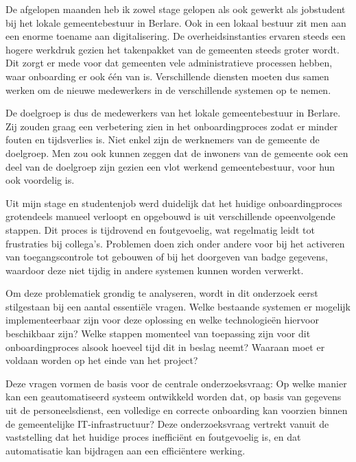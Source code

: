 
De afgelopen maanden heb ik zowel stage gelopen als ook gewerkt als jobstudent bij het lokale gemeentebestuur in Berlare. Ook in een lokaal bestuur zit men aan een enorme toename aan digitalisering. De overheidsinstanties ervaren steeds een hogere werkdruk gezien het takenpakket van de gemeenten steeds groter wordt. Dit zorgt er mede voor dat gemeenten vele administratieve processen hebben, waar onboarding er ook één van is. Verschillende diensten moeten dus samen werken om de nieuwe medewerkers in de verschillende systemen op te nemen. 

De doelgroep is dus de medewerkers van het lokale gemeentebestuur in Berlare. Zij zouden graag een verbetering zien in het onboardingproces zodat er minder fouten en tijdsverlies is. Niet enkel zijn de werknemers van de gemeente de doelgroep. Men zou ook kunnen zeggen dat de inwoners van de gemeente ook een deel van de doelgroep zijn gezien een vlot werkend gemeentebestuur, voor hun ook voordelig is. 

Uit mijn stage en studentenjob werd duidelijk dat het huidige onboardingproces grotendeels manueel verloopt en opgebouwd is uit verschillende opeenvolgende stappen. Dit proces is tijdrovend en foutgevoelig, wat regelmatig leidt tot frustraties bij collega’s. Problemen doen zich onder andere voor bij het activeren van toegangscontrole tot gebouwen of bij het doorgeven van badge gegevens, waardoor deze niet tijdig in andere systemen kunnen worden verwerkt.

Om deze problematiek grondig te analyseren, wordt in dit onderzoek eerst stilgestaan bij een aantal essentiële vragen. Welke bestaande systemen er mogelijk implementeerbaar zijn voor deze oplossing en welke technologieën hiervoor beschikbaar zijn? Welke stappen momenteel van toepassing zijn voor dit onboardingproces alsook hoeveel tijd dit in beslag neemt? Waaraan moet er voldaan worden op het einde van het project?

Deze vragen vormen de basis voor de centrale onderzoeksvraag: Op welke manier kan een geautomatiseerd systeem ontwikkeld worden dat, op basis van gegevens uit de personeelsdienst, een volledige en correcte onboarding kan voorzien binnen de gemeentelijke IT-infrastructuur? Deze onderzoeksvraag vertrekt vanuit de vaststelling dat het huidige proces inefficiënt en foutgevoelig is, en dat automatisatie kan bijdragen aan een efficiëntere werking.

